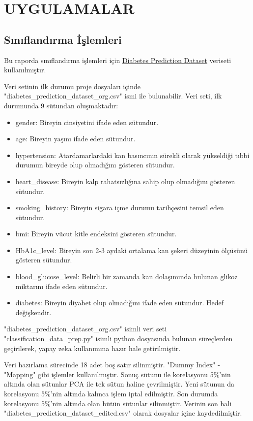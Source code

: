 \newpage
\section{UYGULAMALAR}

\subsection{Sınıflandırma İşlemleri}

Bu raporda sınıflandırma işlemleri için  \href{https://www.kaggle.com/datasets/iammustafatz/diabetes-prediction-dataset/data}{Diabetes Prediction Dataset} veriseti kullanılmıştır.

Veri setinin ilk durumu proje dosyaları içinde "diabetes\_prediction\_dataset\_org.csv" ismi ile bulunabilir. Veri seti, ilk durumunda 9 sütundan oluşmaktadır:
\begin{small}
\begin{itemize}
\item gender: Bireyin cinsiyetini ifade eden sütundur.
\item age: Bireyin yaşını ifade eden sütundur.
\item hypertension: Atardamarlardaki kan basıncının sürekli olarak yükseldiği tıbbi durumun bireyde olup olmadığını gösteren sütundur.
\item heart\_disease: Bireyin kalp rahatsızlığına sahip olup olmadığını gösteren sütundur.
\item smoking\_history: Bireyin sigara içme durumu tarihçesini temsil eden sütundur.
\item bmi: Bireyin vücut kitle endeksini gösteren sütundur.
\item HbA1c\_level: Bireyin son 2-3 aydaki ortalama kan şekeri düzeyinin ölçüsünü gösteren sütundur.
\item blood\_glucose\_level: Belirli bir zamanda kan dolaşımında bulunan glikoz miktarını ifade eden sütundur.
\item diabetes: Bireyin diyabet olup olmadığını ifade eden sütundur. Hedef değişkendir.
\end{itemize}
\end{small}

"diabetes\_prediction\_dataset\_org.csv" isimli veri seti "classification\_data\_prep.py" isimli python dosyasında bulunan süreçlerden geçirilerek, yapay zeka kullanımına hazır hale getirilmiştir. 

Veri hazırlama sürecinde 18 adet boş satır silinmiştir. "Dummy Index" - "Mapping" gibi işlemler kullanılmıştır. Sonuç sütunu ile korelasyonu 5\%'nin altında olan sütunlar PCA ile tek sütun haline çevrilmiştir. Yeni sütunun da korelasyonu 5\%'nin altında kalınca işlem iptal edilmiştir. Son durumda korelasyonu 5\%'nin altında olan bütün sütunlar silinmiştir. Verinin son hali "diabetes\_prediction\_dataset\_edited.csv" olarak dosyalar içine kaydedilmiştir.

